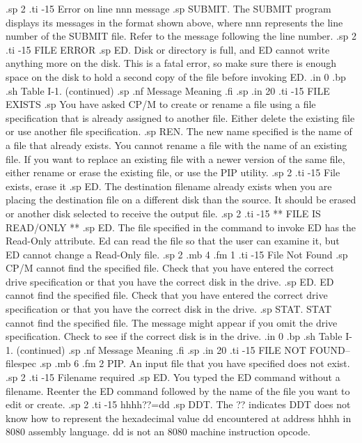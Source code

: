 .sp 2
.ti -15
Error on line nnn message
.sp
SUBMIT.  The SUBMIT program displays its messages in the format 
shown above, where nnn represents the line number of the SUBMIT 
file.  Refer to the message following the line number.
.sp 2
.ti -15
FILE ERROR
.sp
ED.  Disk or directory is full, and ED cannot write anything more 
on the disk.  This is a fatal error, so make sure there is enough 
space on the disk to hold a second copy of the file before 
invoking ED.
.in 0
.bp
.sh
                     Table I-1.  (continued)
.sp
.nf
     Message        Meaning
.fi
.sp
.in 20
.ti -15
FILE EXISTS
.sp
You have asked CP/M to create or rename a file using a file 
specification that is already assigned to another file.  Either 
delete the existing file or use another file specification.
.sp
REN.  The new name specified is the name of a file that already 
exists.  You cannot rename a file with the name of an existing 
file.  If you want to replace an existing file with a newer 
version of the same file, either rename or erase the existing 
file, or use the PIP utility.
.sp 2
.ti -15
File exists, erase it
.sp
ED.  The destination filename already exists when you are placing 
the destination file on a different disk than the source.  It 
should be erased or another disk selected to receive the output 
file.
.sp 2
.ti -15
** FILE IS READ/ONLY **
.sp
ED.  The file specified in the command to invoke ED has the
Read-Only attribute.  Ed can read the file so that the user can 
examine it, but ED cannot change a Read-Only file.
.sp 2
.mb 4
.fm 1
.ti -15
File Not Found
.sp
CP/M cannot find the specified file.  Check that you have entered 
the correct drive specification or that you have the correct disk 
in the drive.
.sp
ED.  ED cannot find the specified file.  Check that you have 
entered the correct drive specification or that you have the 
correct disk in the drive.
.sp
STAT.  STAT cannot find the specified file.  The message might 
appear if you omit the drive specification.  Check to see if the 
correct disk is in the drive.
.in 0
.bp
.sh
                     Table I-1.  (continued)
.sp
.nf
     Message        Meaning
.fi
.sp
.in 20
.ti -15
FILE NOT FOUND--{filespec}
.sp
.mb 6
.fm 2
PIP.  An input file that you have specified does not exist.
.sp 2
.ti -15
Filename required
.sp
ED.  You typed the ED command without a filename.  Reenter the ED 
command followed by the name of the file you want to edit or 
create.
.sp 2
.ti -15
hhhh??=dd
.sp
DDT.  The ?? indicates DDT does not know how to represent the 
hexadecimal value dd encountered at address hhhh in 8080 assembly 
language.  dd is not an 8080 machine instruction opcode.
